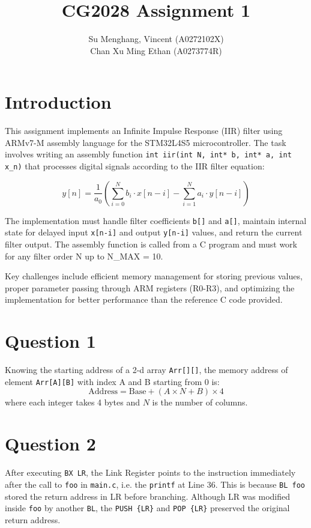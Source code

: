 \documentclass[12pt,a4paper]{article}
\title{CG2028 Assignment 1}
\author{Su Menghang, Vincent (A0272102X) \\ Chan Xu Ming Ethan (A0273774R)}
\date{}
\begin{document}
\maketitle

\section*{Introduction}
This assignment implements an Infinite Impulse Response (IIR) filter using ARMv7-M assembly language for the STM32L4S5 microcontroller. The task involves writing an assembly function \texttt{int iir(int N, int* b, int* a, int x\_n)} that processes digital signals according to the IIR filter equation:

\begin{equation}
y[n] = \frac{1}{a_0} \left( \sum_{i=0}^{N} b_i \cdot x[n-i] - \sum_{i=1}^{N} a_i \cdot y[n-i] \right)
\end{equation}

The implementation must handle filter coefficients \texttt{b[]} and \texttt{a[]}, maintain internal state for delayed input \texttt{x[n-i]} and output \texttt{y[n-i]} values, and return the current filter output. The assembly function is called from a C program and must work for any filter order N up to N\_MAX = 10.

Key challenges include efficient memory management for storing previous values, proper parameter passing through ARM registers (R0-R3), and optimizing the implementation for better performance than the reference C code provided.

\section*{Question 1}
Knowing the starting address of a 2-d array \texttt{Arr[][]}, the memory address of element \texttt{Arr[A][B]} 
with index A and B starting from 0 is:
\begin{equation}
\text{Address} = \text{Base} + (A \times N + B) \times 4
\end{equation}
where each integer takes 4 bytes and $N$ is the number of columns.

\section*{Question 2}
After executing \texttt{BX LR}, the Link Register points to the instruction immediately after the call to \texttt{foo} 
in \texttt{main.c}, i.e. the \texttt{printf} at Line 36. This is because \texttt{BL foo} stored the return address in LR 
before branching. Although LR was modified inside \texttt{foo} by another \texttt{BL}, the \texttt{PUSH \{LR\}} 
and \texttt{POP \{LR\}} preserved the original return address.
\end{document}
